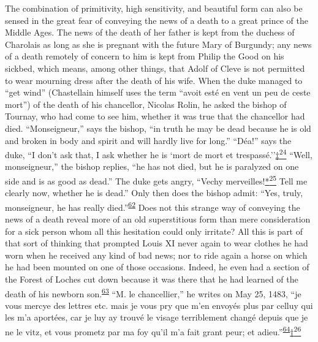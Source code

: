 The combination of primitivity, high sensitivity, and beautiful form can
also be sensed in the great fear of conveying the news of a death to a
great prince of the Middle Ages. The news of the death of her father is
kept from the duchess of Charolais as long as she is pregnant with the
future Mary of Burgundy; any news of a death remotely of concern to him
is kept from Philip the Good on his sickbed, which means, among other
things, that Adolf of Cleve is not permitted to wear mourning dress
after the death of his wife. When the duke managed to ``get wind''
(Chastellain himself uses the term ``avoit esté en vent un peu de ceste
mort'') of the death of his chancellor, Nicolas Rolin, he asked the
bishop of Tournay, who had come to see him, whether it was true that the
chancellor had died. ``Monseigneur,'' says the bishop, ``in truth he may
be dead because he is old and broken in body and spirit and will hardly
live for long.'' ``Déa!'' says the duke, ``I don't ask that, I ask
whether he is `mort de mort et
trespassé.''\protect\hypertarget{09_Chapter_Two__THE_CRAVING_FOR_A_M.xhtmlux5cux23id_2455}{\protect\hyperlink{23_NOTES.xhtmlux5cux23id_2456}{‡\textsuperscript{24}}}
``Well,
monsei\protect\hypertarget{09_Chapter_Two__THE_CRAVING_FOR_A_M.xhtmlux5cux23page_56}{}{}gneur,''
the bishop replies, ``he has not died, but he is paralyzed on one side
and is as good as dead.'' The duke gets angry, ``Vechy
merveilles!\protect\hypertarget{09_Chapter_Two__THE_CRAVING_FOR_A_M.xhtmlux5cux23id_2457}{\protect\hyperlink{23_NOTES.xhtmlux5cux23id_2458}{*\textsuperscript{25}}}
Tell me clearly now, whether he is dead.'' Only then does the bishop
admit: ``Yes, truly, monseigneur, he has really
died.''\textsuperscript{\protect\hypertarget{09_Chapter_Two__THE_CRAVING_FOR_A_M.xhtmlux5cux23id_1964}{\protect\hyperlink{23_NOTES.xhtmlux5cux23id_1965}{62}}}
Does not this strange way of conveying the news of a death reveal more
of an old superstitious form than mere consideration for a sick person
whom all this hesitation could only irritate? All this is part of that
sort of thinking that prompted Louis XI never again to wear clothes he
had worn when he received any kind of bad news; nor to ride again a
horse on which he had been mounted on one of those occasions. Indeed, he
even had a section of the Forest of Loches cut down because it was there
that he had learned of the death of his newborn
son.\textsuperscript{\protect\hypertarget{09_Chapter_Two__THE_CRAVING_FOR_A_M.xhtmlux5cux23id_1962}{\protect\hyperlink{23_NOTES.xhtmlux5cux23id_1963}{63}}}
``M. le chancellier,'' he writes on May 25, 1483, ``je vous mercye des
lettres etc. mais je vous pry que m'en envoyés plus par celluy qui les
m'a aportées, car je luy ay trouvé le visage terriblement changé depuis
que je ne le vitz, et vous prometz par ma foy qu'il m'a fait grant peur;
et
adieu.''\textsuperscript{\protect\hypertarget{09_Chapter_Two__THE_CRAVING_FOR_A_M.xhtmlux5cux23id_1960}{\protect\hyperlink{23_NOTES.xhtmlux5cux23id_1961}{64}}}\protect\hypertarget{09_Chapter_Two__THE_CRAVING_FOR_A_M.xhtmlux5cux23id_2459}{\protect\hyperlink{23_NOTES.xhtmlux5cux23id_2460}{†\textsuperscript{26}}}

